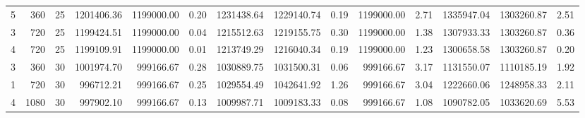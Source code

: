 \begin{tabular}{rrrrrrrrrrrrrr}
     5 &   360 &    25 &    1201406.36 & 1199000.00 &            0.20 &     1231438.64 &  1229140.74 &                 0.19 &     1199000.00 &                    2.71 &    1335947.04 & 1303260.87 &            2.51 \\
     3 &   720 &    25 &    1199424.51 & 1199000.00 &            0.04 &     1215512.63 &  1219155.75 &                 0.30 &     1199000.00 &                    1.38 &    1307933.33 & 1303260.87 &            0.36 \\
     4 &   720 &    25 &    1199109.91 & 1199000.00 &            0.01 &     1213749.29 &  1216040.34 &                 0.19 &     1199000.00 &                    1.23 &    1300658.58 & 1303260.87 &            0.20 \\
     3 &   360 &    30 &    1001974.70 &  999166.67 &            0.28 &     1030889.75 &  1031500.31 &                 0.06 &      999166.67 &                    3.17 &    1131550.07 & 1110185.19 &            1.92 \\
     1 &   720 &    30 &     996712.21 &  999166.67 &            0.25 &     1029554.49 &  1042641.92 &                 1.26 &      999166.67 &                    3.04 &    1222660.06 & 1248958.33 &            2.11 \\
     4 &  1080 &    30 &     997902.10 &  999166.67 &            0.13 &     1009987.71 &  1009183.33 &                 0.08 &      999166.67 &                    1.08 &    1090782.05 & 1033620.69 &            5.53 \\
\bottomrule
\end{tabular}
